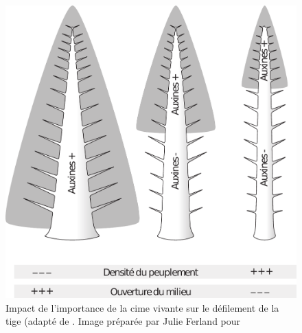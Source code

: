 \begin{figure}[h]
\centering
\includegraphics[scale=0.5]{img/ch2_auxine}
\caption{Impact de l'importance de la cime vivante sur le défilement de la tige (adapté de \cite{jozsa1994discussion}. Image préparée par Julie Ferland pour \cite{achim2010dendroecologie}}
\label{auxines}
\end{figure}

% 
% 
% 
% 
